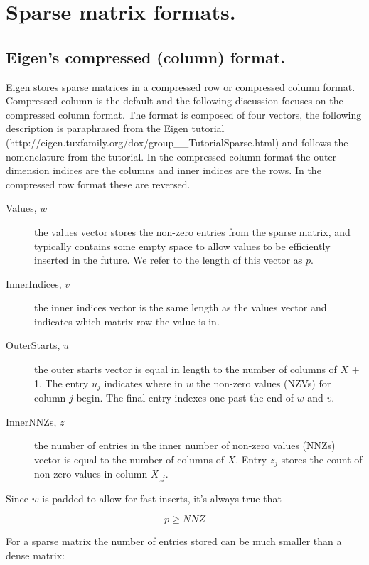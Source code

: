 \chapter{Sparse matrix formats.}

\section{Eigen's compressed (column) format.}

Eigen stores sparse matrices in a compressed row or compressed column
format.  Compressed column is the default and the following discussion
focuses on the compressed column format.  The format is composed of
four vectors, the following description is paraphrased from the Eigen
tutorial (http://eigen.tuxfamily.org/dox/group__TutorialSparse.html) and
follows the nomenclature from the tutorial.  In the compressed column
format the outer dimension indices are the columns and inner indices are
the rows.  In the compressed row format these are reversed.

\begin{description}
\item[Values, $w$] the values vector stores the non-zero entries from the sparse matrix, and
typically contains some empty space to allow values to be efficiently
inserted in the future.  We refer to the length of this vector as $p$.
\item[InnerIndices, $v$] the inner indices vector is the same length as the
values vector and indicates which matrix row the value is in. 
\item[OuterStarts, $u$] the outer starts vector is equal in length to the
number of columns of $X$ + 1.  The entry $u_j$ indicates where
in $w$ the non-zero values (NZVs) for column $j$ begin.  The final entry
indexes one-past the end of $w$ and $v$.
\item[InnerNNZs, $z$] the number of entries in the inner number of non-zero values (NNZs) vector
is equal to the number of columns of $X$.  Entry $z_j$ stores the count
of non-zero values in column $X_{,j}$.
\end{description}

Since $w$ is padded to allow for fast inserts, it's always true that

\begin{equation}
p \geq NNZ
\end{equation}

For a sparse matrix the number of entries stored can be much smaller
than a dense matrix:

